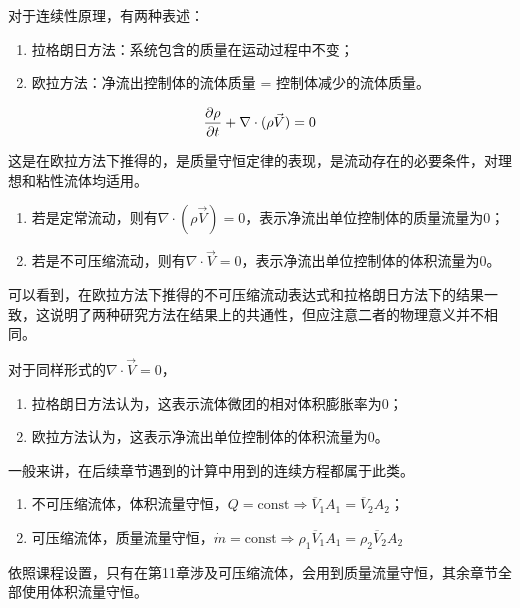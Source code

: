 \label{3.5}

对于连续性原理，有两种表述：
\begin{enumerate}
	\item 拉格朗日方法：系统包含的质量在运动过程中不变；
	\item 欧拉方法：净流出控制体的流体质量 = 控制体减少的流体质量。
\end{enumerate}


\begin{equation}
	\pdv{\rho}{t} + \nabla \cdot (\rho \vec{V}) = 0
\end{equation}

这是在欧拉方法下推得的，是质量守恒定律的表现，是流动存在的必要条件，对理想和粘性流体均适用。

\begin{enumerate}
	\item 若是定常流动，则有$\nabla \cdot (\rho \vec{V}) = 0$，表示净流出单位控制体的质量流量为0；
	\item 若是不可压缩流动，则有$\nabla \cdot \vec{V} = 0$，表示净流出单位控制体的体积流量为0。
\end{enumerate}

\begin{tip}
	可以看到，在欧拉方法下推得的不可压缩流动表达式和拉格朗日方法下的结果一致，这说明了两种研究方法在结果上的共通性，但应注意二者的物理意义并不相同。
	
	对于同样形式的$\nabla \cdot \vec{V} = 0$，
	
	\begin{enumerate}
		\item 拉格朗日方法认为，这表示流体微团的相对体积膨胀率为0；
		\item 欧拉方法认为，这表示净流出单位控制体的体积流量为0。
	\end{enumerate}
\end{tip}


一般来讲，在后续章节遇到的计算中用到的连续方程都属于此类。

\begin{enumerate}
	\item 不可压缩流体，体积流量守恒，$Q = \text{const} \Rightarrow \overline{V}_1A_1 = \overline{V}_2A_2$；
	\item 可压缩流体，质量流量守恒，$\dot{m} = \text{const} \Rightarrow \rho_1\overline{V}_1A_1 = \rho_2\overline{V}_2A_2$
\end{enumerate}

\begin{tip}
	依照课程设置，只有在第11章涉及可压缩流体，会用到质量流量守恒，其余章节全部使用体积流量守恒。
\end{tip}
